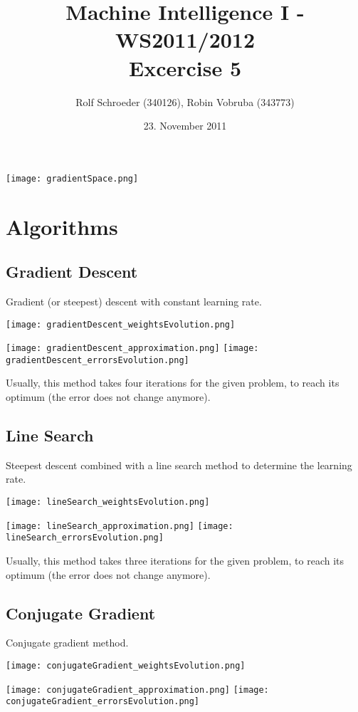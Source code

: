 \documentclass[a4paper,headings=small]{scrartcl}
\title{Machine Intelligence I - WS2011/2012\\Excercise 5}
\author{Rolf Schroeder (340126), Robin Vobruba (343773)}
\date{23. November 2011}
\numberwithin{equation}{section} %
\numberwithin{figure}{section}   %
\begin{document}
\maketitle

\texttt{[image: gradientSpace.png]}


\newpage
\section{Algorithms}


\subsection{Gradient Descent}

Gradient (or steepest) descent with constant learning rate.

\texttt{[image: gradientDescent\_weightsEvolution.png]}

\texttt{[image: gradientDescent\_approximation.png]}
\texttt{[image: gradientDescent\_errorsEvolution.png]}

Usually, this method takes four iterations for the given problem,
to reach its optimum (the error does not change anymore).


\newpage
\subsection{Line Search}

Steepest descent combined with a line search method to determine the learning rate.

\texttt{[image: lineSearch\_weightsEvolution.png]}

\texttt{[image: lineSearch\_approximation.png]}
\texttt{[image: lineSearch\_errorsEvolution.png]}

Usually, this method takes three iterations for the given problem,
to reach its optimum (the error does not change anymore).


\newpage
\subsection{Conjugate Gradient}

Conjugate gradient method.

\texttt{[image: conjugateGradient\_weightsEvolution.png]}

\texttt{[image: conjugateGradient\_approximation.png]}
\texttt{[image: conjugateGradient\_errorsEvolution.png]}
\end{document}
